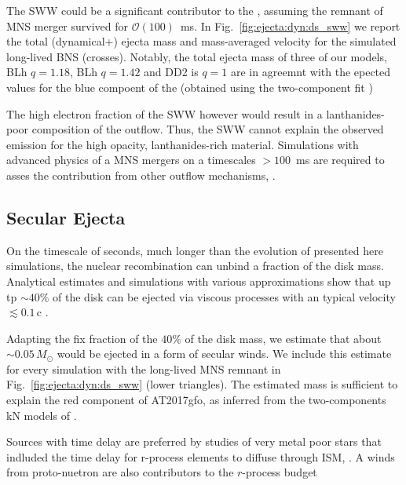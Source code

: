 The \ac{SWW} could be a significant contributor to the \AT{}, assuming the remnant of 
\GW{} \ac{MNS} merger survived for $\mathcal{O}(100)$~ms.
In Fig.~\ref{fig:ejecta:dyn:ds_sww} we report the total
(dynamical+\swind{}) ejecta mass and mass-averaged velocity for the
simulated long-lived BNS (crosses).
Notably, the total ejecta mass of three of our models, 
BLh $q=1.18$, BLh $q=1.42$ and  DD2 is $q=1$ are in agreemnt with the epected values 
for the blue compoent of the \AT{} 
(obtained using the two-component fit \citep{Villar:2017wcc})


The high electron fraction of the \ac{SWW} however would result in a lanthanides-poor
composition of the outflow. Thus, the \ac{SWW} cannot explain the observed emission 
for the high opacity, lanthanides-rich material.
Simulations with advanced physics of a \ac{MNS} mergers on a timescales $>100$~ms are 
required to asses the contribution from other outflow mechanisms,  
\citep{Lee:2009uc,Fernandez:2015use,Siegel:2017nub,Fujibayashi:2017puw,Fernandez:2018kax,Radice:2018xqa}.


\subsection{Secular Ejecta}


On the timescale of seconds, much longer than the evolution of 
presented here simulations, the nuclear recombination can unbind 
a fraction of the disk mass. 
Analytical estimates and simulations with various approximations show that up tp ${\sim}40\%$ of the disk can be ejected via viscous processes with an typical velocity ${\lesssim}0.1\,$c
\citep{Lee:2009uc,Fernandez:2015use,Wu:2016pnw,Siegel:2017nub,Fujibayashi:2017puw,Fernandez:2018kax,Radice:2018xqa,Fujibayashi:2020dvr}.

Adapting the fix fraction of the $40\%$ of the disk mass, we estimate 
that about  ${\sim}0.05\, M_{\odot}$ would be ejected in a form of 
secular winds. We include this estimate for every simulation
with the long-lived \ac{MNS} remnant in Fig.~\ref{fig:ejecta:dyn:ds_sww} (lower triangles).
The estimated mass is sufficient to explain
the red component of AT2017gfo, as inferred from the two-components kN
models of \cite{Villar:2017wcc}. 







Sources with time delay are preferred by studies of very metal poor stars that indluded the time delay for r-process elements
to diffuse through ISM, \citep{Tarumi:2021xvw}. 
A winds from proto-nuetron are also contributors to the $r$-process budget \cite{Vincenzo:2021rvw}

